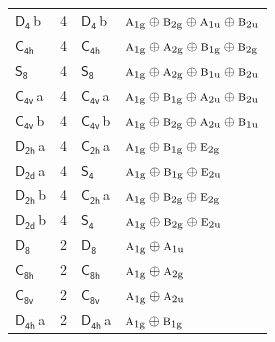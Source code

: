 \documentclass[10pt,a4paper]{article}
\numberwithin{equation}{section}
\newcommand{\grp}[1]{\mathsf{#1}}
\newcommand{\irr}[1]{\text{\normalfont\scshape #1}}
\newcommand{\ptag}[1]{\mathrm{#1}}
\newcommand{\clsletter}[1]{\,{\scriptsize\color{black!55}#1}}
\newlength{\fillwidth}\newlength{\cellwidth}\newlength{\colwidth}
\begin{document}
{\begin{longtable}{@{}lrl>{\RaggedRight\arraybackslash}p{\fillwidth}@{}}
\href{D4.pdf}{$\grp{D_{4}}$}\clsletter{b} & 4 & \href{D4.pdf}{$\grp{D_{4}}$}\clsletter{b} & $\irr{a}_{1\ptag{g}}\oplus \irr{b}_{2\ptag{g}}\oplus \irr{a}_{1\ptag{u}}\oplus \irr{b}_{2\ptag{u}}$\\
\href{C4h.pdf}{$\grp{C_{4h}}$} & 4 & \href{C4h.pdf}{$\grp{C_{4h}}$} & $\irr{a}_{1\ptag{g}}\oplus \irr{a}_{2\ptag{g}}\oplus \irr{b}_{1\ptag{g}}\oplus \irr{b}_{2\ptag{g}}$\\
\href{S8.pdf}{$\grp{S_{8}}$} & 4 & \href{S8.pdf}{$\grp{S_{8}}$} & $\irr{a}_{1\ptag{g}}\oplus \irr{a}_{2\ptag{g}}\oplus \irr{b}_{1\ptag{u}}\oplus \irr{b}_{2\ptag{u}}$\\
\href{C4v.pdf}{$\grp{C_{4v}}$}\clsletter{a} & 4 & \href{C4v.pdf}{$\grp{C_{4v}}$}\clsletter{a} & $\irr{a}_{1\ptag{g}}\oplus \irr{b}_{1\ptag{g}}\oplus \irr{a}_{2\ptag{u}}\oplus \irr{b}_{2\ptag{u}}$\\
\href{C4v.pdf}{$\grp{C_{4v}}$}\clsletter{b} & 4 & \href{C4v.pdf}{$\grp{C_{4v}}$}\clsletter{b} & $\irr{a}_{1\ptag{g}}\oplus \irr{b}_{2\ptag{g}}\oplus \irr{a}_{2\ptag{u}}\oplus \irr{b}_{1\ptag{u}}$\\
\href{D2h.pdf}{$\grp{D_{2h}}$}\clsletter{a} & 4 & \href{C2h.pdf}{$\grp{C_{2h}}$}\clsletter{a} & $\irr{a}_{1\ptag{g}}\oplus \irr{b}_{1\ptag{g}}\oplus \irr{e}_{2\ptag{g}}$\\
\href{D2d.pdf}{$\grp{D_{2d}}$}\clsletter{a} & 4 & \href{S4.pdf}{$\grp{S_{4}}$} & $\irr{a}_{1\ptag{g}}\oplus \irr{b}_{1\ptag{g}}\oplus \irr{e}_{2\ptag{u}}$\\
\href{D2h.pdf}{$\grp{D_{2h}}$}\clsletter{b} & 4 & \href{C2h.pdf}{$\grp{C_{2h}}$}\clsletter{a} & $\irr{a}_{1\ptag{g}}\oplus \irr{b}_{2\ptag{g}}\oplus \irr{e}_{2\ptag{g}}$\\
\href{D2d.pdf}{$\grp{D_{2d}}$}\clsletter{b} & 4 & \href{S4.pdf}{$\grp{S_{4}}$} & $\irr{a}_{1\ptag{g}}\oplus \irr{b}_{2\ptag{g}}\oplus \irr{e}_{2\ptag{u}}$\\
\href{D8.pdf}{$\grp{D_{8}}$} & 2 & \href{D8.pdf}{$\grp{D_{8}}$} & $\irr{a}_{1\ptag{g}}\oplus \irr{a}_{1\ptag{u}}$\\
\href{C8h.pdf}{$\grp{C_{8h}}$} & 2 & \href{C8h.pdf}{$\grp{C_{8h}}$} & $\irr{a}_{1\ptag{g}}\oplus \irr{a}_{2\ptag{g}}$\\
\href{C8v.pdf}{$\grp{C_{8v}}$} & 2 & \href{C8v.pdf}{$\grp{C_{8v}}$} & $\irr{a}_{1\ptag{g}}\oplus \irr{a}_{2\ptag{u}}$\\
\href{D4h.pdf}{$\grp{D_{4h}}$}\clsletter{a} & 2 & \href{D4h.pdf}{$\grp{D_{4h}}$}\clsletter{a} & $\irr{a}_{1\ptag{g}}\oplus \irr{b}_{1\ptag{g}}$\\

\end{longtable}}
\end{document}
